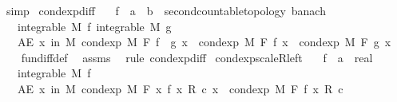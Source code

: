 \begin{isabellebody}
\ simp%
\endisatagproof
{\isafoldproof}%
%
\isadelimproof
\isanewline
%
\endisadelimproof
\isanewline
{}\isamarkupfalse%
\ cond{\isacharunderscore}{\kern0pt}exp{\isacharunderscore}{\kern0pt}diff{\isacharprime}{\kern0pt}{\isacharcolon}{\kern0pt}\isanewline
\ \ \ f\ {\isacharcolon}{\kern0pt}{\isacharcolon}{\kern0pt}\ {\isachardoublequoteopen}{\isacharprime}{\kern0pt}a\ {\isasymRightarrow}\ {\isacharprime}{\kern0pt}b\ {\isacharcolon}{\kern0pt}{\isacharcolon}{\kern0pt}\ {\isacharbraceleft}{\kern0pt}second{\isacharunderscore}{\kern0pt}countable{\isacharunderscore}{\kern0pt}topology{\isacharcomma}{\kern0pt}\ banach{\isacharbraceright}{\kern0pt}{\isachardoublequoteclose}\isanewline
\ \ \ {\isachardoublequoteopen}integrable\ M\ f{\isachardoublequoteclose}\ {\isachardoublequoteopen}integrable\ M\ g{\isachardoublequoteclose}\isanewline
\ \ \ {\isachardoublequoteopen}AE\ x\ in\ M{\isachardot}{\kern0pt}\ cond{\isacharunderscore}{\kern0pt}exp\ M\ F\ {\isacharparenleft}{\kern0pt}f\ {\isacharminus}{\kern0pt}\ g{\isacharparenright}{\kern0pt}\ x\ {\isacharequal}{\kern0pt}\ cond{\isacharunderscore}{\kern0pt}exp\ M\ F\ f\ x\ {\isacharminus}{\kern0pt}\ cond{\isacharunderscore}{\kern0pt}exp\ M\ F\ g\ x{\isachardoublequoteclose}\isanewline
%
\isadelimproof
\ \ %
\endisadelimproof
%
\isatagproof
{}\isamarkupfalse%
\ fun{\isacharunderscore}{\kern0pt}diff{\isacharunderscore}{\kern0pt}def\ \isamarkupfalse%
\ assms\ \isamarkupfalse%
\ {\isacharparenleft}{\kern0pt}rule\ cond{\isacharunderscore}{\kern0pt}exp{\isacharunderscore}{\kern0pt}diff{\isacharparenright}{\kern0pt}%
\endisatagproof
{\isafoldproof}%
%
\isadelimproof
\isanewline
%
\endisadelimproof
\isanewline
{}\isamarkupfalse%
\ cond{\isacharunderscore}{\kern0pt}exp{\isacharunderscore}{\kern0pt}scaleR{\isacharunderscore}{\kern0pt}left{\isacharcolon}{\kern0pt}\isanewline
\ \ \ f\ {\isacharcolon}{\kern0pt}{\isacharcolon}{\kern0pt}\ {\isachardoublequoteopen}{\isacharprime}{\kern0pt}a\ {\isasymRightarrow}\ real{\isachardoublequoteclose}\isanewline
\ \ \ {\isachardoublequoteopen}integrable\ M\ f{\isachardoublequoteclose}\isanewline
\ \ \ {\isachardoublequoteopen}AE\ x\ in\ M{\isachardot}{\kern0pt}\ cond{\isacharunderscore}{\kern0pt}exp\ M\ F\ {\isacharparenleft}{\kern0pt}{\isasymlambda}x{\isachardot}{\kern0pt}\ f\ x\ {\isacharasterisk}{\kern0pt}\isactrlsub R\ c{\isacharparenright}{\kern0pt}\ x\ {\isacharequal}{\kern0pt}\ cond{\isacharunderscore}{\kern0pt}exp\ M\ F\ f\ x\ {\isacharasterisk}{\kern0pt}\isactrlsub R\ c{\isachardoublequoteclose}\ \isanewline

\end{isabellebody}
